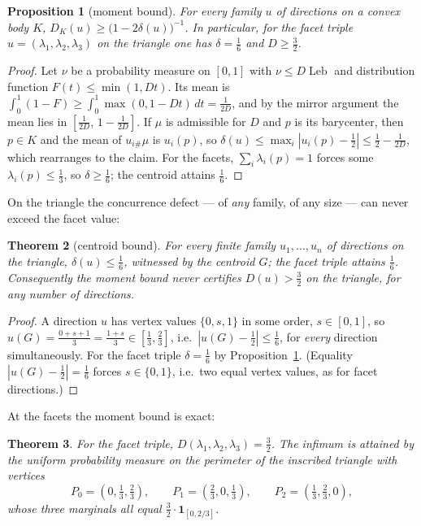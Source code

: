 \documentclass[11pt,reqno]{amsart}
\theoremstyle{plain}
\newtheorem{theorem}{Theorem}[section]
\newtheorem{proposition}[theorem]{Proposition}
\theoremstyle{definition}
\theoremstyle{remark}
\newcommand{\Leb}{\operatorname{Leb}}
\begin{document}
\begin{proposition}[moment bound]\label{prop:moment}
For every family $u$ of directions on a convex body $K$,
$D_K(u)\ge\bigl(1-2\delta(u)\bigr)^{-1}$. In particular, for the facet triple
$u=(\lambda_1,\lambda_2,\lambda_3)$ on the triangle one has $\delta=\tfrac16$
and $D\ge\tfrac32$.
\end{proposition}

\begin{proof}
Let $\nu$ be a probability measure on $[0,1]$ with $\nu\le D\Leb$ and
distribution function $F(t)\le\min(1,Dt)$. Its mean is
$\int_0^1(1-F)\ge\int_0^1\max(0,1-Dt)\,dt=\tfrac1{2D}$, and by the mirror
argument the mean lies in $[\tfrac1{2D},\,1-\tfrac1{2D}]$. If $\mu$ is
admissible for $D$ and $p$ is its barycenter, then $p\in K$ and the mean of
$u_{i\#}\mu$ is $u_i(p)$, so
$\delta(u)\le\max_i|u_i(p)-\tfrac12|\le\tfrac12-\tfrac1{2D}$, which rearranges
to the claim. For the facets, $\sum_i\lambda_i(p)=1$ forces some
$\lambda_i(p)\le\tfrac13$, so $\delta\ge\tfrac16$; the centroid attains
$\tfrac16$.
\end{proof}

On the triangle the concurrence defect --- of \emph{any} family, of any size
--- can never exceed the facet value:

\begin{theorem}[centroid bound]\label{thm:centroid}
For every finite family $u_1,\dots,u_n$ of directions on the triangle,
$\delta(u)\le\tfrac16$, witnessed by the centroid $G$; the facet triple attains
$\tfrac16$. Consequently the moment bound never certifies
$D(u)>\tfrac32$ on the triangle, for any number of directions.
\end{theorem}

\begin{proof}
A direction $u$ has vertex values $\{0,s,1\}$ in some order, $s\in[0,1]$, so
$u(G)=\tfrac{0+s+1}3=\tfrac{1+s}3\in[\tfrac13,\tfrac23]$, i.e.\
$|u(G)-\tfrac12|\le\tfrac16$, for \emph{every} direction simultaneously. For
the facet triple $\delta=\tfrac16$ by Proposition~\ref{prop:moment}. (Equality
$|u(G)-\tfrac12|=\tfrac16$ forces $s\in\{0,1\}$, i.e.\ two equal vertex
values, as for facet directions.)
\end{proof}

At the facets the moment bound is exact:

\begin{theorem}\label{thm:facetdefect}
For the facet triple, $D(\lambda_1,\lambda_2,\lambda_3)=\tfrac32$. The infimum
is attained by the uniform probability measure on the perimeter of the inscribed
triangle with vertices
\[
P_0=(0,\tfrac13,\tfrac23),\qquad P_1=(\tfrac23,0,\tfrac13),\qquad
P_2=(\tfrac13,\tfrac23,0),
\]
whose three marginals all equal $\tfrac32\cdot\mathbf 1_{[0,2/3]}$.
\end{theorem}
\end{document}
